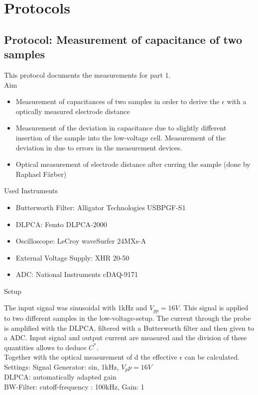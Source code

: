 \chapter{Protocols}
\section{Protocol: Measurement of capacitance of two samples}
This protocol documents the measurements for part 1. \\
{\Large Aim}
\begin{itemize}
\item Measurement of capacitances of two samples in order to derive the $\epsilon$ with a optically measured electrode distance 
\item Measurement of the deviation in capacitance due to slightly different insertion of the sample into the low-voltage cell. Measurement of the deviation in due to errors in the measurement devices. 
\item Optical measurement of electrode distance after curring the sample (done by Raphael F\"arber) 
\end{itemize}
 
\par
{\large Used Instruments}
\begin{itemize}
 \item Butterworth Filter: Alligator Technologies USBPGF-S1
 \item DLPCA: Femto DLPCA-2000
 \item Oscilloscope: LeCroy waveSurfer 24MXs-A
 \item External Voltage Supply:  XHR 20-50
 \item ADC: National Instruments cDAQ-9171

\end{itemize}


{\large Setup} 

The input signal was  sinusoidal with 1kHz and $V_{pp}=16V$. This signal is applied to two different samples in the low-voltage-setup. The current through the probe is amplified with the DLPCA, filtered with a Butterworth filter and then given to a ADC. 
Input signal and output current are measured and the division of these quantities allows to deduce $C^*$.\\
Together with the optical measurement of d the effective $\epsilon$ can be calculated. \\

{\large Settings:} \newline
Signal Generator:  sin, 1kHz, $V_pp=16V$\\
DLPCA:  automatically adapted gain\\
BW-Filter:  cutoff-frequency : 100kHz, Gain: 1

